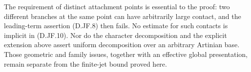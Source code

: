 \begin{remark}
The requirement of distinct attachment points is essential to
the proof: two different branches at the same point can have
arbitrarily large contact, and the leading-term assertion
(D.JF.8) then fails.  No estimate for such contacts is implicit
in (D.JF.10).  Nor do the character decomposition and the
explicit extension above assert uniform decomposition over
an arbitrary Artinian base.  Those geometric and family
issues, together with an effective global presentation,
remain separate from the finite-jet bound proved here.
\end{remark}
